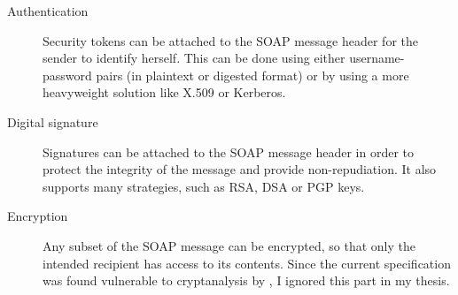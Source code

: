 \begin{description}
 \item[Authentication] Security tokens can be attached to the SOAP message header for the sender to identify herself. This can be done using either username-password pairs (in plaintext or digested format) or by using a more heavyweight solution like X.509 or Kerberos.
 \item[Digital signature] Signatures can be attached to the SOAP message header in order to protect the integrity of the message and provide non-repudiation. It also supports many strategies, such as RSA, DSA or PGP keys.
 \item[Encryption] Any subset of the SOAP message can be encrypted, so that only the intended recipient has access to its contents. Since the current specification was found vulnerable to cryptanalysis by \cite{acm-xmlenc-breaking}, I ignored this part in my thesis. \label{xmlenc}
\end{description}
